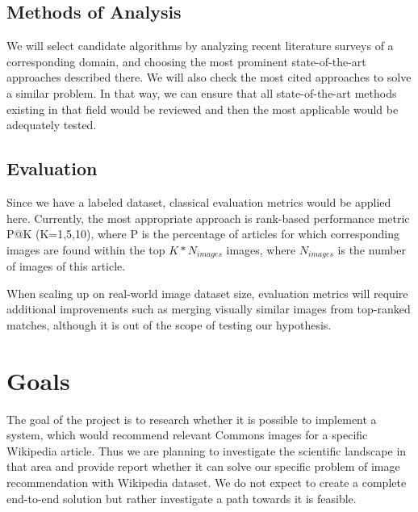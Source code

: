 \documentclass[runningheads]{llncs}
\begin{document}
\subsection{Methods of Analysis}
We will select candidate algorithms by analyzing recent literature surveys of a corresponding domain, and choosing the most prominent state-of-the-art approaches described there. We will also check the most cited approaches to solve a similar problem. In that way, we can ensure that all state-of-the-art methods existing in that field would be reviewed and then the most applicable would be adequately tested.

\subsection{Evaluation}
Since we have a labeled dataset, classical evaluation metrics would be applied here. Currently, the most appropriate approach is rank-based performance metric \cite{ref_evalmetric} P@K (K=1,5,10), where P is the percentage of articles for which corresponding images are found within the top $K * N_{images}$ images, where $N_{images}$ is the number of images of this article.

When scaling up on real-world image dataset size, evaluation metrics will require additional improvements such as merging visually similar images from top-ranked matches, although it is out of the scope of testing our hypothesis.


\section{Goals}
The goal of the project is to research whether it is possible to implement a system, which would recommend relevant Commons\cite{ref_wiki_commons} images for a specific Wikipedia article. Thus we are planning to investigate the scientific landscape in that area and provide report whether it can solve our specific problem of image recommendation with Wikipedia dataset. We do not expect to create a complete end-to-end solution but rather investigate a path towards it is feasible.
\end{document}

